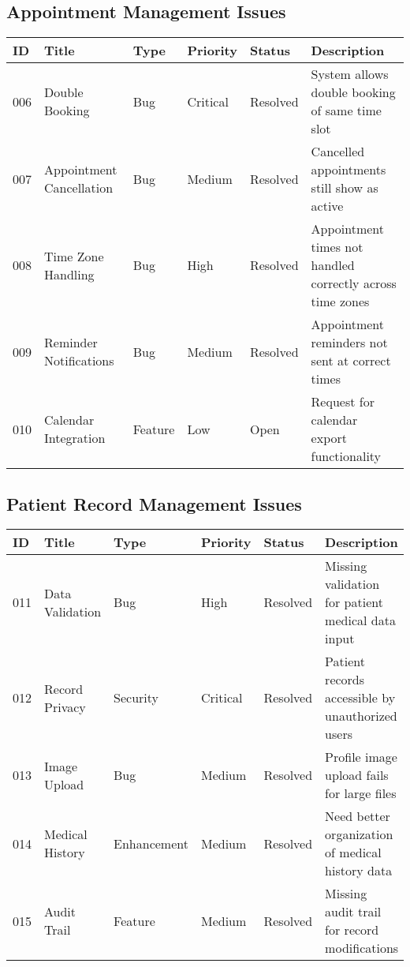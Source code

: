 \documentclass[12pt,a4paper]{article}
\begin{document}
\subsection{Appointment Management Issues}

\begin{longtable}{|p{0.8cm}|p{2.5cm}|p{1.5cm}|p{1.5cm}|p{1.5cm}|p{4.2cm}|}
\hline
\textbf{ID} & \textbf{Title} & \textbf{Type} & \textbf{Priority} & \textbf{Status} & \textbf{Description} \\
\hline
006 & Double Booking & Bug & Critical & Resolved & System allows double booking of same time slot \\
\hline
007 & Appointment Cancellation & Bug & Medium & Resolved & Cancelled appointments still show as active \\
\hline
008 & Time Zone Handling & Bug & High & Resolved & Appointment times not handled correctly across time zones \\
\hline
009 & Reminder Notifications & Bug & Medium & Resolved & Appointment reminders not sent at correct times \\
\hline
010 & Calendar Integration & Feature & Low & Open & Request for calendar export functionality \\
\hline
\end{longtable}

\subsection{Patient Record Management Issues}

\begin{longtable}{|p{0.8cm}|p{2.5cm}|p{1.5cm}|p{1.5cm}|p{1.5cm}|p{4.2cm}|}
\hline
\textbf{ID} & \textbf{Title} & \textbf{Type} & \textbf{Priority} & \textbf{Status} & \textbf{Description} \\
\hline
011 & Data Validation & Bug & High & Resolved & Missing validation for patient medical data input \\
\hline
012 & Record Privacy & Security & Critical & Resolved & Patient records accessible by unauthorized users \\
\hline
013 & Image Upload & Bug & Medium & Resolved & Profile image upload fails for large files \\
\hline
014 & Medical History & Enhancement & Medium & Resolved & Need better organization of medical history data \\
\hline
015 & Audit Trail & Feature & Medium & Resolved & Missing audit trail for record modifications \\
\hline
\end{longtable}
\end{document}
